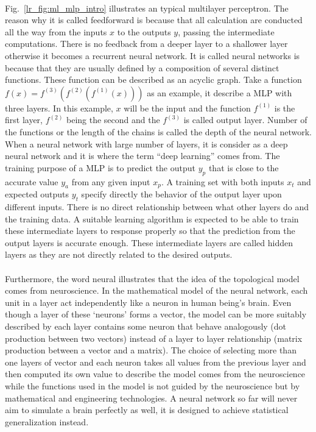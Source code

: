 \paragraph{}
Fig.~\ref{lr_fig:ml_mlp_intro} illustrates an typical multilayer perceptron.
The reason why it is called feedforward is because that all calculation are conducted all the way from the inputs $x$ to the outputs $y$, passing the intermediate computations.
There is no feedback from a deeper layer to a shallower layer otherwise it becomes a recurrent neural network.
It is called neural networks is because that they are usually defined by a composition of several distinct functions.
These function can be described as an acyclic graph.
Take a function $f(x) = f^{(3)}(f^{(2)}(f^{(1)}(x)))$ as an example, it describe a MLP with three layers.
In this example, $x$ will be the input and the function $f^{(1)}$ is the first layer, $f^{(2)}$ being the second and the $f^{(3)}$ is called output layer.
Number of the functions or the length of the chains is called the depth of the neural network.
When a neural network with large number of layers, it is consider as a deep neural network and it is where the term ``deep learning'' comes from.
The training purpose of a MLP is to predict the output $y_p$ that is close to the accurate value $y_a$ from any given input $x_p$.
A training set with both inputs $x_t$ and expected outputs $y_t$ specify directly the behavior of the output layer upon different inputs.
There is no direct relationship between what other layers do and the training data.
A suitable learning algorithm is expected to be able to train these intermediate layers to response properly so that the prediction from the output layers is accurate enough.
These intermediate layers are called hidden layers as they are not directly related to the desired outputs.
\paragraph{}
Furthermore, the word neural illustrates that the idea of the topological model comes from neuroscience.
In the mathematical model of the neural network, each unit in a layer act independently like a neuron in human being's brain.
Even though a layer of these `neurons' forms a vector, the model can be more suitably described by each layer contains some neuron that behave analogously (dot production between two vectors) instead of a layer to layer relationship (matrix production between a vector and a matrix).
The choice of selecting more than one layers of vector and each neuron takes all values from the previous layer and then computed its own value to describe the model comes from the neuroscience while the functions used in the model is not guided by the neuroscience but by mathematical and engineering technologies.
A neural network so far will never aim to simulate a brain perfectly as well, it is designed to achieve statistical generalization instead.

